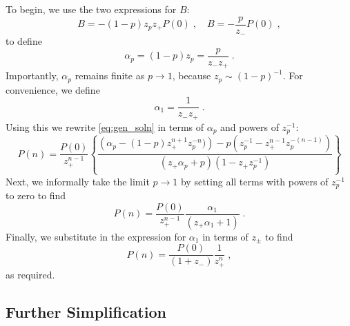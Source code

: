 \documentclass[a4paper,10pt]{article}
\begin{document}
To begin, we use the two expressions for $B$:
\begin{equation}
  B = -(1-p)z_pz_+P(0) \;, \quad B = -\frac{p}{z_-}P(0) \;,
\end{equation}
to define
\begin{equation}
  \alpha_p = (1-p)z_p = \frac{p}{z_-z_+} \;.
\end{equation}
Importantly, $\alpha_p$ remains finite as $p\to 1$, because $z_p \sim (1-p)^{-1}$. For convenience, we define
\begin{equation}
  \alpha_1 = \frac{1}{z_-z_+} \;.
\end{equation}
Using this we rewrite \eqref{eq:gen_soln} in terms of $\alpha_p$ and powers of $z_p^{-1}$:
\begin{equation}
 P(n) = \frac{P(0)}{z_+^{n-1}} \left\{
                                \frac
                                {
                                  \left( \alpha_p - (1-p)z_+^{n+1}z_p^{-n}) \right) - p \left( z_p^{-1} - z_+^{n-1}z_p^{-(n-1)} \right)
                                }
                                {
                                  \left( z_+ \alpha_p + p \right) \left( 1 - z_+ z_p^{-1} \right)
                                }
                               \right\}
\end{equation}
Next, we informally take the limit $p\to1$ by setting all terms with powers of $z_p^{-1}$ to zero to find
\begin{equation}
  P(n) = \frac{P(0)}{z_+^{n-1}} \frac{\alpha_1}{(z_+ \alpha_1 + 1)} \;.
\end{equation}
Finally, we substitute in the expression for $\alpha_1$ in terms of $z_\pm$ to find
\begin{equation}
  P(n) = \frac{P(0)}{(1+z_-)} \frac{1}{z_+^n} \;,
\end{equation}
as required.

\subsection{Further Simplification}
\end{document}
